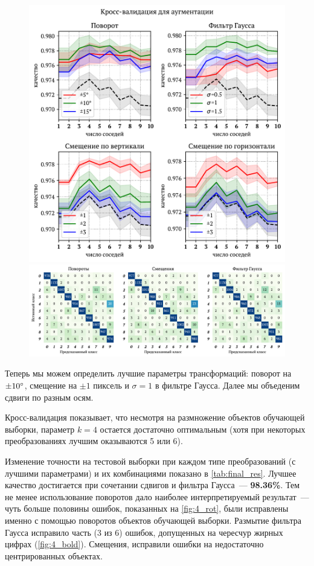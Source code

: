 \documentclass[12pt]{article}
\begin{document}
\begin{figure}[!h]
    \includegraphics{5_cv}
    \caption{}
    \label{fig:5_cv}
    \includegraphics[width=\textwidth]{5_conf}
    \caption{}
    \label{fig:5_conf}
\end{figure}

Теперь мы можем определить лучшие параметры трансформаций: поворот на $\pm10\degree$, смещение на $\pm1$ пиксель и $\sigma=1$ в фильтре Гаусса. Далее мы объеденим сдвиги по разным осям.

Кросс-валидация показывает, что несмотря на размножение объектов обучающей выборки, параметр $k=4$ остается достаточно оптимальным (хотя при некоторых преобразованиях лучшим оказываются 5 или 6).

Изменение точности на тестовой выборки при каждом типе преобразований (с лучшими параметрами) и их комбинациями показано в \autoref{tab:final_res}. Лучшее качество достигается при сочетании сдвигов и фильтра Гаусса~--- \textbf{98.36\%}. Тем не менее использование поворотов дало наиболее интерпретируемый результат~--- чуть больше половины ошибок, показанных на \autoref{fig:4_rot}, были исправлены именно с помощью поворотов объектов обучающей выборки. Размытие фильтра Гаусса исправило часть (3 из 6) ошибок, допущенных на чересчур жирных цифрах (\autoref{fig:4_bold}). Смещения, исправили ошибки на недостаточно центрированных объектах.
\end{document}
